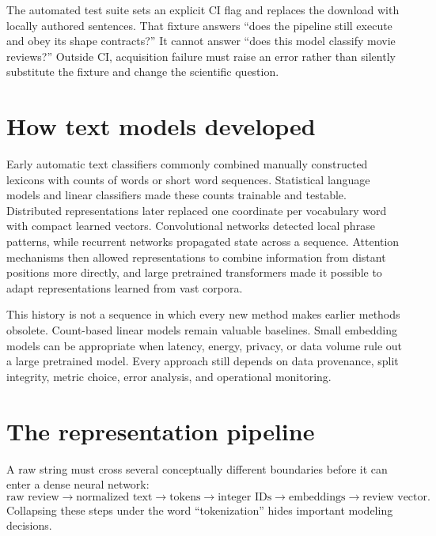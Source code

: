 \begin{professionalbox}
The automated test suite sets an explicit CI flag and replaces the download
with locally authored sentences. That fixture answers ``does the pipeline still
execute and obey its shape contracts?'' It cannot answer ``does this model
classify movie reviews?'' Outside CI, acquisition failure must raise an error
rather than silently substitute the fixture and change the scientific question.
\end{professionalbox}

\section{How text models developed}

Early automatic text classifiers commonly combined manually constructed
lexicons with counts of words or short word sequences. Statistical language
models and linear classifiers made these counts trainable and testable.
Distributed representations later replaced one coordinate per vocabulary word
with compact learned vectors. Convolutional networks detected local phrase
patterns, while recurrent networks propagated state across a sequence.
Attention mechanisms then allowed representations to combine information from
distant positions more directly, and large pretrained transformers made it
possible to adapt representations learned from vast corpora.

This history is not a sequence in which every new method makes earlier methods
obsolete. Count-based linear models remain valuable baselines. Small embedding
models can be appropriate when latency, energy, privacy, or data volume rule
out a large pretrained model. Every approach still depends on data provenance,
split integrity, metric choice, error analysis, and operational monitoring.

\section{The representation pipeline}

A raw string must cross several conceptually different boundaries before it
can enter a dense neural network:
\[
\text{raw review}
\longrightarrow \text{normalized text}
\longrightarrow \text{tokens}
\longrightarrow \text{integer IDs}
\longrightarrow \text{embeddings}
\longrightarrow \text{review vector}.
\]
Collapsing these steps under the word ``tokenization'' hides important modeling
decisions.

